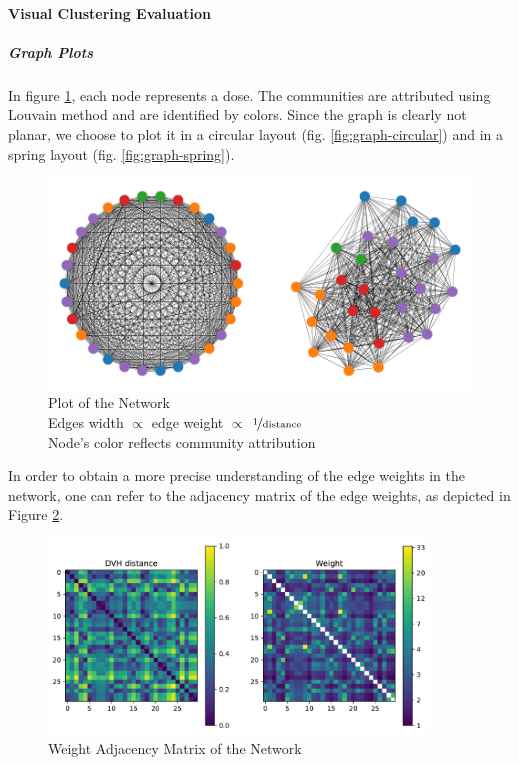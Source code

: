 \paragraph{Visual Clustering Evaluation}
\subparagraph{Graph Plots}
In figure \ref{fig:graph}, each node represents a dose.
The communities are attributed using Louvain method and are identified by colors.
Since the graph is clearly not planar, we choose to plot it in a circular layout (fig. \ref{fig:graph-circular}) and in a spring layout (fig. \ref{fig:graph-spring}).
\begin{figure}
	\centering
	\includegraphics[width=\textwidth]{dose_clustering_figures/graph.pdf}
	\caption{
		Plot of the Network\\
		Edges width $\propto$ edge weight $\propto$ $\nicefrac{\text{1}}{\text{distance}}$\\
		Node's color reflects community attribution
	}
	\label{fig:graph}
\end{figure}

In order to obtain a more precise understanding of the edge weights in the network, one can refer to the adjacency matrix of the edge weights, as depicted in Figure \ref{fig:adjacency}.
\begin{figure}
	\centering
	\includegraphics[width=0.9\textwidth]{dose_clustering_figures/adjacency.pdf}
	\caption{Weight Adjacency Matrix of the Network}
	\label{fig:adjacency}
\end{figure}

